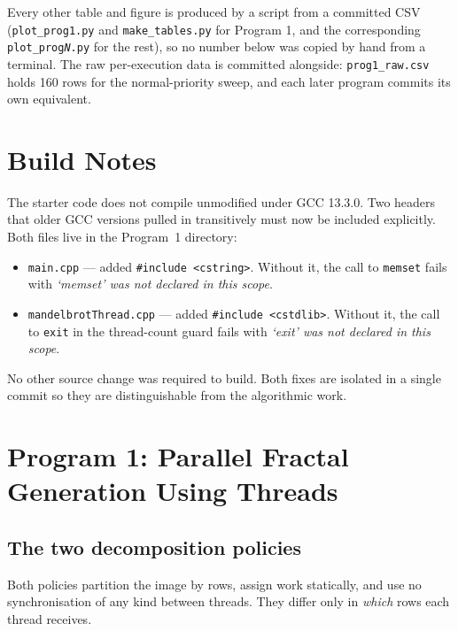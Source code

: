 \documentclass[11pt,a4paper]{article}
\begin{document}
Every other table and figure is produced by a script from a committed CSV
(\texttt{plot\_prog1.py} and \texttt{make\_tables.py} for Program 1, and
the corresponding \texttt{plot\_prog\emph{N}.py} for the rest), so no
number below was copied by hand from a terminal. The raw per-execution data
is committed alongside: \texttt{prog1\_raw.csv} holds 160 rows for the
normal-priority sweep, and each later program commits its own equivalent.

\section{Build Notes}

The starter code does not compile unmodified under GCC 13.3.0. Two headers
that older GCC versions pulled in transitively must now be included
explicitly. Both files live in the Program~1 directory:

\begin{itemize}
\item \texttt{main.cpp} --- added
      \texttt{\#include <cstring>}. Without it, the call to \texttt{memset}
      fails with \emph{`memset' was not declared in this scope}.
\item \texttt{mandelbrotThread.cpp} --- added
      \texttt{\#include <cstdlib>}. Without it, the call to \texttt{exit} in
      the thread-count guard fails with \emph{`exit' was not declared in this
      scope}.
\end{itemize}

No other source change was required to build. Both fixes are isolated in a
single commit so they are distinguishable from the algorithmic work.

\section{Program 1: Parallel Fractal Generation Using Threads}

\subsection{The two decomposition policies}

Both policies partition the image by rows, assign work statically, and use no
synchronisation of any kind between threads. They differ only in \emph{which}
rows each thread receives.
\end{document}
